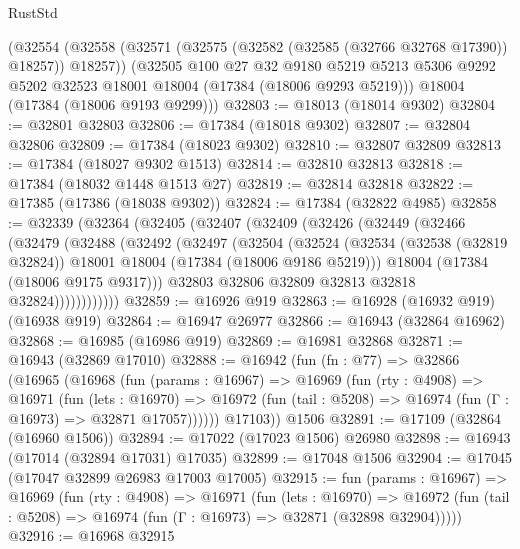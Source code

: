 \begin{lexlean}{RustStd}
\begin{coremodule}
    (@32554
      (@32558 (@32571 (@32575 (@32582 (@32585 (@32766 @32768 @17390)) @18257)) @18257))
      (@32505
        @100
        @27
        @32
        @9180
        @5219
        @5213
        @5306
        @9292
        @5202
        @32523
        @18001
        @18004
        (@17384 (@18006 @9293 @5219)))
      @18004
      (@17384 (@18006 @9193 @9299)))
@32803 := @18013 (@18014 @9302)
@32804 := @32801 @32803
@32806 := @17384 (@18018 @9302)
@32807 := @32804 @32806
@32809 := @17384 (@18023 @9302)
@32810 := @32807 @32809
@32813 := @17384 (@18027 @9302 @1513)
@32814 := @32810 @32813
@32818 := @17384 (@18032 @1448 @1513 @27)
@32819 := @32814 @32818
@32822 := @17385 (@17386 (@18038 @9302))
@32824 := @17384 (@32822 @4985)
@32858 := @32339
    (@32364
      (@32405
        (@32407
          (@32409
            (@32426
              (@32449
                (@32466
                  (@32479
                    (@32488
                      (@32492
                        (@32497
                          (@32504
                            (@32524
                              (@32534
                                (@32538 (@32819 @32824))
                                @18001
                                @18004
                                (@17384 (@18006 @9186 @5219)))
                              @18004
                              (@17384 (@18006 @9175 @9317)))
                            @32803
                            @32806
                            @32809
                            @32813
                            @32818
                            @32824))))))))))))
@32859 := @16926 @919
@32863 := @16928 (@16932 @919) (@16938 @919)
@32864 := @16947 @26977
@32866 := @16943 (@32864 @16962)
@32868 := @16985 (@16986 @919)
@32869 := @16981 @32868
@32871 := @16943 (@32869 @17010)
@32888 := @16942
    (fun (fn : @77) =>
    @32866
      (@16965
        (@16968
          (fun (params : @16967) =>
          @16969
            (fun (rty : @4908) =>
            @16971
              (fun (lets : @16970) =>
              @16972 (fun (tail : @5208) => @16974 (fun (Γ : @16973) => @32871 @17057))))))
        @17103))
    @1506
@32891 := @17109 (@32864 (@16960 @1506))
@32894 := @17022 (@17023 @1506) @26980
@32898 := @16943 (@17014 (@32894 @17031) @17035)
@32899 := @17048 @1506
@32904 := @17045 (@17047 @32899 @26983 @17003 @17005)
@32915 := fun (params : @16967) =>
  @16969
    (fun (rty : @4908) =>
    @16971
      (fun (lets : @16970) =>
      @16972 (fun (tail : @5208) => @16974 (fun (Γ : @16973) => @32871 (@32898 @32904)))))
@32916 := @16968 @32915

\end{coremodule}
\end{lexlean}
